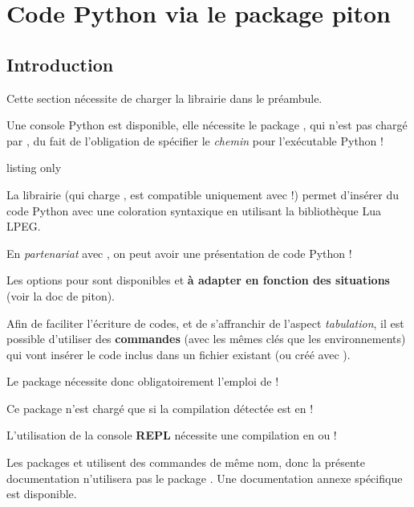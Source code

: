 \section{Code Python via le package piton}\label{pythonpiton}

\subsection{Introduction}

\begin{noteblock}
 Cette section nécessite de charger la \textsf{librairie}  dans le préambule.

 Une console \textsf{Python} est disponible, elle nécessite le package , qui n'est pas chargé par , du fait de l'obligation de spécifier le \textit{chemin} pour l'exécutable \textsf{Python} !
\end{noteblock}

\begin{PresCodeTexPL}{listing only}
\usepackage[executable=...]{pyluatex} %
\end{PresCodeTexPL}

\begin{noteblock}
La \textsf{librairie}  (qui charge , est compatible uniquement avec  !) permet d'insérer du code \textsf{Python} avec une coloration syntaxique en utilisant la bibliothèque \textsf{Lua LPEG}.

\smallskip

En \textit{partenariat} avec , on peut avoir une présentation de code \textsf{Python} !

\smallskip

 Les options pour  sont disponibles et \textbf{à adapter en fonction des situations} (voir la doc de \textsf{piton}).

\smallskip

 Afin de faciliter l'écriture de codes, et de s'affranchir de l'aspect \textit{tabulation}, il est possible d'utiliser des \textbf{commandes} (avec les mêmes clés que les environnements) qui vont insérer le code inclus dans un fichier existant (ou créé avec ).
\end{noteblock}

\begin{warningblock}
Le package  nécessite donc obligatoirement l’emploi de  !

Ce package n'est chargé que si la compilation détectée est en  !

\smallskip

 L'utilisation de la console \textbf{REPL} nécessite une compilation en  ou  !

 Les packages  et  utilisent des commandes de même nom, donc la présente documentation n'utilisera pas le package . Une documentation annexe spécifique est disponible.
\end{warningblock}

